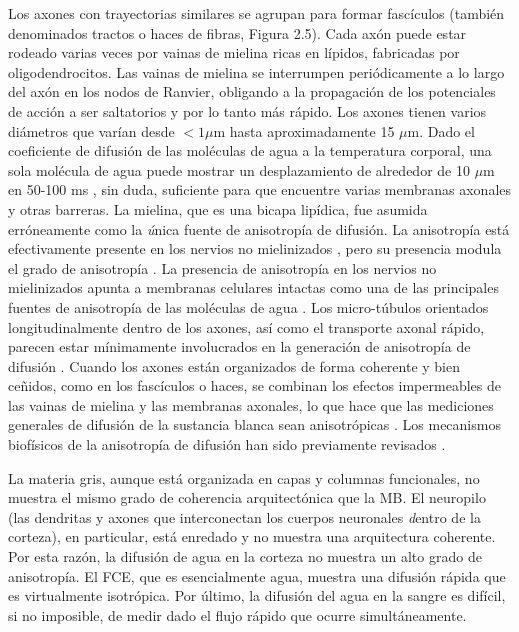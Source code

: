 Los axones con trayectorias similares se agrupan para formar fascículos (también denominados tractos o haces de fibras, Figura 2.5). Cada axón puede estar rodeado varias veces por vainas de mielina ricas en lípidos, fabricadas por oligodendrocitos. Las vainas de mielina se interrumpen periódicamente a lo largo del axón en los nodos de Ranvier, obligando a la propagación de los potenciales de acción a ser saltatorios y por lo tanto más rápido. Los axones tienen varios diámetros que varían desde $< 1 \mu$m hasta aproximadamente 15 \(\mu\)m. Dado el coeficiente de difusión de las moléculas de agua a la temperatura corporal, una sola molécula de agua puede mostrar un desplazamiento de alrededor de 10 \(\mu\)m en 50-100 ms \cite{Le_Bihan_2002}, sin duda, suficiente para que encuentre varias membranas axonales y otras barreras. La mielina, que es una bicapa lipídica, fue asumida erróneamente como la {\emph única} fuente de anisotropía de difusión. La anisotropía está efectivamente presente en los nervios no mielinizados \cite{Beaulieu_1994,Gulani_2001}, pero su presencia modula el grado de anisotropía \cite{Gulani_2001,Tyszka_2006}. La presencia de anisotropía en los nervios no mielinizados apunta a membranas celulares intactas como una de las principales fuentes de anisotropía de las moléculas de agua \cite{Beaulieu_1994,Gulani_2001}. Los micro-túbulos orientados longitudinalmente dentro de los axones, así como el transporte axonal rápido, parecen estar mínimamente involucrados en la generación de anisotropía de difusión \cite{Beaulieu_1994}. Cuando los axones están organizados de forma coherente y bien ceñidos, como en los fascículos o haces, se combinan los efectos impermeables de las vainas de mielina y las membranas axonales, lo que hace que las mediciones generales de difusión de la sustancia blanca sean anisotrópicas \cite{Pierpaoli_1996,Beaulieu2002}. Los mecanismos biofísicos de la anisotropía de difusión han sido previamente revisados \cite{Beaulieu2002}.

La materia gris, aunque está organizada en capas y columnas funcionales, no muestra el mismo grado de coherencia arquitectónica que la MB. El neuropilo (las dendritas y axones que interconectan los cuerpos neuronales {\emph dentro} de la corteza), en particular, está enredado y no muestra una arquitectura coherente. Por esta razón, la difusión de agua en la corteza no muestra un alto grado de anisotropía. El FCE, que es esencialmente agua, muestra una difusión rápida que es virtualmente isotrópica. Por último, la difusión del agua en la sangre es difícil, si no imposible, de medir dado el flujo rápido que ocurre simultáneamente.

